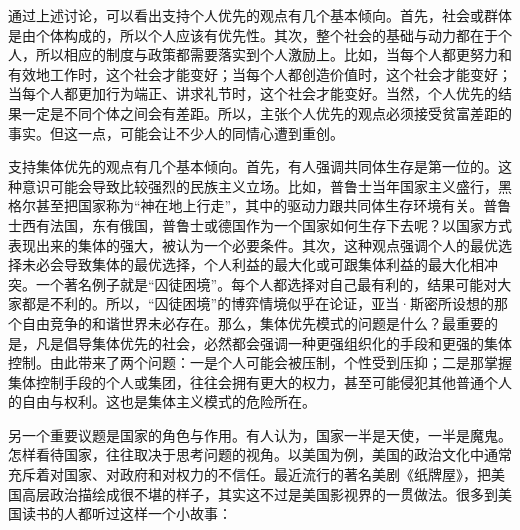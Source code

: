 通过上述讨论，可以看出支持个人优先的观点有几个基本倾向。首先，社会或群体是由个体构成的，所以个人应该有优先性。其次，整个社会的基础与动力都在于个人，所以相应的制度与政策都需要落实到个人激励上。比如，当每个人都更努力和有效地工作时，这个社会才能变好；当每个人都创造价值时，这个社会才能变好；当每个人都更加行为端正、讲求礼节时，这个社会才能变好。当然，个人优先的结果一定是不同个体之间会有差距。所以，主张个人优先的观点必须接受贫富差距的事实。但这一点，可能会让不少人的同情心遭到重创。

支持集体优先的观点有几个基本倾向。首先，有人强调共同体生存是第一位的。这种意识可能会导致比较强烈的民族主义立场。比如，普鲁士当年国家主义盛行，黑格尔甚至把国家称为“神在地上行走”，其中的驱动力跟共同体生存环境有关。普鲁士西有法国，东有俄国，普鲁士或德国作为一个国家如何生存下去呢？以国家方式表现出来的集体的强大，被认为一个必要条件。其次，这种观点强调个人的最优选择未必会导致集体的最优选择，个人利益的最大化或可跟集体利益的最大化相冲突。一个著名例子就是“囚徒困境”。每个人都选择对自己最有利的，结果可能对大家都是不利的。所以，“囚徒困境”的博弈情境似乎在论证，亚当·斯密所设想的那个自由竞争的和谐世界未必存在。那么，集体优先模式的问题是什么？最重要的是，凡是倡导集体优先的社会，必然都会强调一种更强组织化的手段和更强的集体控制。由此带来了两个问题：一是个人可能会被压制，个性受到压抑；二是那掌握集体控制手段的个人或集团，往往会拥有更大的权力，甚至可能侵犯其他普通个人的自由与权利。这也是集体主义模式的危险所在。

另一个重要议题是国家的角色与作用。有人认为，国家一半是天使，一半是魔鬼。怎样看待国家，往往取决于思考问题的视角。以美国为例，美国的政治文化中通常充斥着对国家、对政府和对权力的不信任。最近流行的著名美剧《纸牌屋》，把美国高层政治描绘成很不堪的样子，其实这不过是美国影视界的一贯做法。很多到美国读书的人都听过这样一个小故事：


